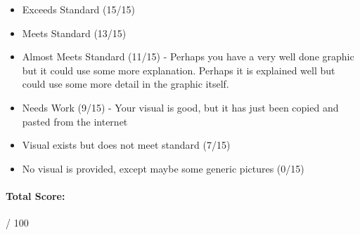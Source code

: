 \documentclass[11pt]{exam}
\begin{document}
\begin{itemize}
  \item Exceeds Standard (15/15)
  \item Meets Standard (13/15)
  \item Almost Meets Standard (11/15) - 
    Perhaps you have a very well done graphic but it could use some more explanation.  Perhaps it is explained well but could use some more detail in the graphic itself.
  \item Needs Work (9/15) -
    Your visual is good, but it has just been copied and pasted from the internet
  \item Visual exists but does not meet standard (7/15)
  \item No visual is provided, except maybe some generic pictures (0/15)
  
\end{itemize}

\paragraph{Total Score:}
  \fillin[][3em] / 100
 
\end{document}

